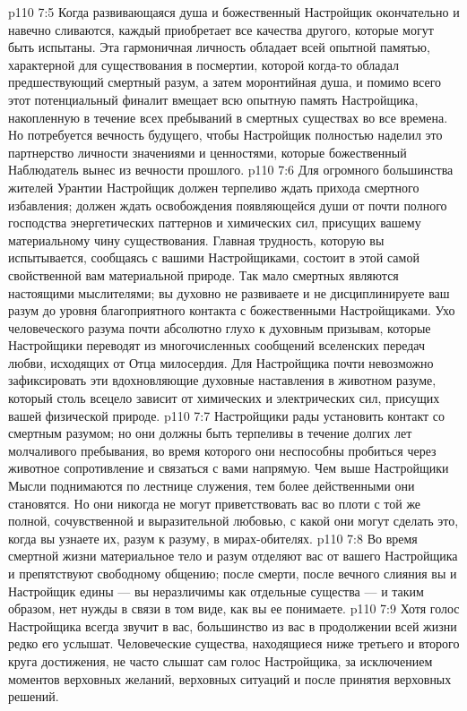 \vs p110 7:5 Когда развивающаяся душа и божественный Настройщик окончательно и навечно сливаются, каждый приобретает все качества другого, которые могут быть испытаны. Эта гармоничная личность обладает всей опытной памятью, характерной для существования в посмертии, которой когда\hyp{}то обладал предшествующий смертный разум, а затем моронтийная душа, и помимо всего этот потенциальный финалит вмещает всю опытную память Настройщика, накопленную в течение всех пребываний в смертных существах во все времена. Но потребуется вечность будущего, чтобы Настройщик полностью наделил это партнерство личности значениями и ценностями, которые божественный Наблюдатель вынес из вечности прошлого.
\vs p110 7:6 \pc Для огромного большинства жителей Урантии Настройщик должен терпеливо ждать прихода смертного избавления; должен ждать освобождения появляющейся души от почти полного господства энергетических паттернов и химических сил, присущих вашему материальному чину существования. Главная трудность, которую вы испытывается, сообщаясь с вашими Настройщиками, состоит в этой самой свойственной вам материальной природе. Так мало смертных являются настоящими мыслителями; вы духовно не развиваете и не дисциплинируете ваш разум до уровня благоприятного контакта с божественными Настройщиками. Ухо человеческого разума почти абсолютно глухо к духовным призывам, которые Настройщики переводят из многочисленных сообщений вселенских передач любви, исходящих от Отца милосердия. Для Настройщика почти невозможно зафиксировать эти вдохновляющие духовные наставления в животном разуме, который столь всецело зависит от химических и электрических сил, присущих вашей физической природе.
\vs p110 7:7 Настройщики рады установить контакт со смертным разумом; но они должны быть терпеливы в течение долгих лет молчаливого пребывания, во время которого они неспособны пробиться через животное сопротивление и связаться с вами напрямую. Чем выше Настройщики Мысли поднимаются по лестнице служения, тем более действенными они становятся. Но они никогда не могут приветствовать вас во плоти с той же полной, сочувственной и выразительной любовью, с какой они могут сделать это, когда вы узнаете их, разум к разуму, в мирах\hyp{}обителях.
\vs p110 7:8 Во время смертной жизни материальное тело и разум отделяют вас от вашего Настройщика и препятствуют свободному общению; после смерти, после вечного слияния вы и Настройщик едины --- вы неразличимы как отдельные существа --- и таким образом, нет нужды в связи в том виде, как вы ее понимаете.
\vs p110 7:9 Хотя голос Настройщика всегда звучит в вас, большинство из вас в продолжении всей жизни редко его услышат. Человеческие существа, находящиеся ниже третьего и второго круга достижения, не часто слышат сам голос Настройщика, за исключением моментов верховных желаний, верховных ситуаций и после принятия верховных решений.
